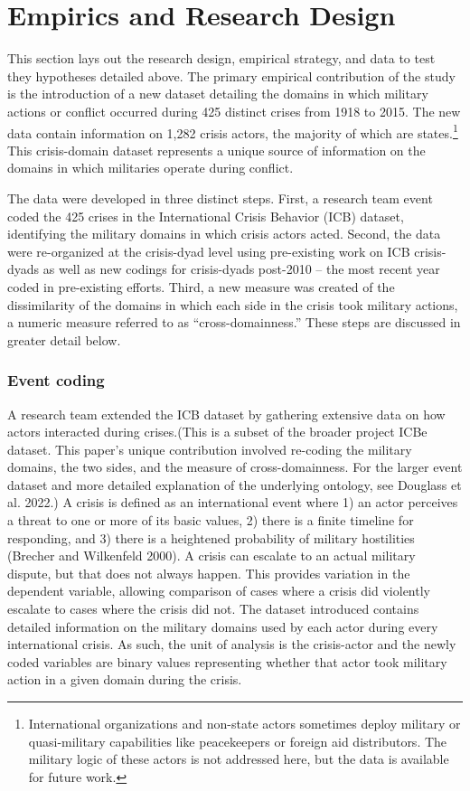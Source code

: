 \documentclass[
]{article}
\begin{document}
\hypertarget{empirics-and-research-design}{%
\section{Empirics and Research Design}\label{empirics-and-research-design}}

This section lays out the research design, empirical strategy, and data to test they hypotheses detailed above. The primary empirical contribution of the study is the introduction of a new dataset detailing the domains in which military actions or conflict occurred during 425 distinct crises from 1918 to 2015. The new data contain information on 1,282 crisis actors, the majority of which are states.\footnote{International organizations and non-state actors sometimes deploy military or quasi-military capabilities like peacekeepers or foreign aid distributors. The military logic of these actors is not addressed here, but the data is available for future work.} This crisis-domain dataset represents a unique source of information on the domains in which militaries operate during conflict.

The data were developed in three distinct steps. First, a research team event coded the 425 crises in the International Crisis Behavior (ICB) dataset, identifying the military domains in which crisis actors acted. Second, the data were re-organized at the crisis-dyad level using pre-existing work on ICB crisis-dyads as well as new codings for crisis-dyads post-2010 -- the most recent year coded in pre-existing efforts. Third, a new measure was created of the dissimilarity of the domains in which each side in the crisis took military actions, a numeric measure referred to as ``cross-domainness.'' These steps are discussed in greater detail below.

\hypertarget{event-coding}{%
\subsubsection{Event coding}\label{event-coding}}

A research team extended the ICB dataset by gathering extensive data on how actors interacted during crises.(This is a subset of the broader project ICBe dataset. This paper's unique contribution involved re-coding the military domains, the two sides, and the measure of cross-domainness. For the larger event dataset and more detailed explanation of the underlying ontology, see Douglass et al. 2022.) A crisis is defined as an international event where 1) an actor perceives a threat to one or more of its basic values, 2) there is a finite timeline for responding, and 3) there is a heightened probability of military hostilities (Brecher and Wilkenfeld 2000). A crisis can escalate to an actual military dispute, but that does not always happen. This provides variation in the dependent variable, allowing comparison of cases where a crisis did violently escalate to cases where the crisis did not. The dataset introduced contains detailed information on the military domains used by each actor during every international crisis. As such, the unit of analysis is the crisis-actor and the newly coded variables are binary values representing whether that actor took military action in a given domain during the crisis.
\end{document}
